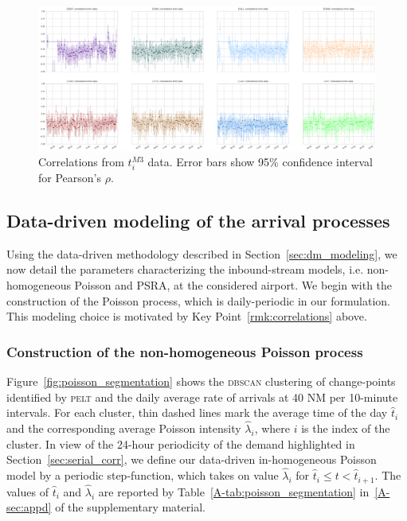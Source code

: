 \documentclass[draft,review]{elsarticle}
\makeatletter
\newcommand*{\ie}{i.e.\@\xspace}
\newcommand{\PELT}{\textsc{pelt}}
\newcommand{\DBSCAN}{\textsc{dbscan}}
\makeatother
\begin{document}
\begin{figure}
    \includegraphics[width=\textwidth]{correlations_true}
    \caption{Correlations from \(t^{M3}_i\) data. Error bars show 95\% confidence interval for Pearson's \(\rho\).}
    \label{fig:correlations_true}
\end{figure}

\subsection{Data-driven modeling of the arrival processes}\label{sec:modeling}

Using the data-driven methodology described in Section~\ref{sec:dm_modeling}, we now detail the parameters characterizing the inbound-stream models, \ie{} non-homogeneous Poisson and \ac{PSRA}, at the considered airport.
We begin with the construction of the Poisson process, which is daily-periodic in our formulation.
This modeling choice is motivated by Key Point~\ref{rmk:correlations} above.

\subsubsection{Construction of the non-homogeneous Poisson process}\label{sec:pois}

Figure~\ref{fig:poisson_segmentation} shows the \DBSCAN{} clustering of change-points identified by \PELT{} and the daily average rate of arrivals at 40 NM per 10-minute  intervals.
For each cluster, thin dashed lines mark the average time of the day \(\hat{t}_i\) and the corresponding average Poisson intensity \(\hat{\lambda}_i\), where \(i\) is the index of the cluster.
In view of the 24-hour periodicity of the demand highlighted in Section~\ref{sec:serial_corr}, we define our data-driven in-homogeneous Poisson model by a periodic step-function, which takes on value \(\hat{\lambda}_i\) for \(\hat{t}_i \leq t < \hat{t}_{i+1}\).
The values of \(\hat{t}_i\) and \(\hat{\lambda}_i\) are reported by Table~\ref{A-tab:poisson_segmentation} in~\ref{A-sec:appd} of the supplementary material.
\end{document}
